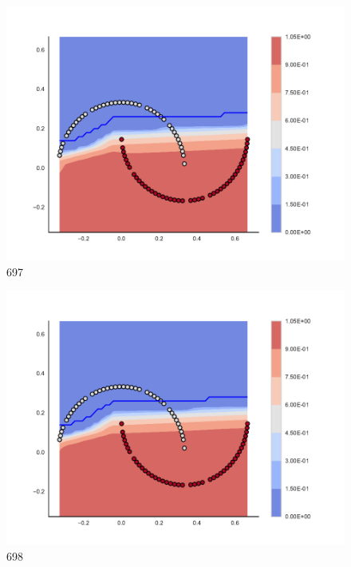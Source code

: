 \begin{subfigure}[b]{0.09\textwidth}
    \includegraphics[clip, trim=2.35cm 1.75cm 4.5cm 0cm,width=\textwidth]{img/convergence/697.pdf}
    \caption{697}
    \label{fig:convergence_697}
\end{subfigure}
%
\begin{subfigure}[b]{0.09\textwidth}
    \includegraphics[clip, trim=2.35cm 1.75cm 4.5cm 0cm,width=\textwidth]{img/convergence/698.pdf}
    \caption{698}
    \label{fig:convergence_698}
\end{subfigure}
%
